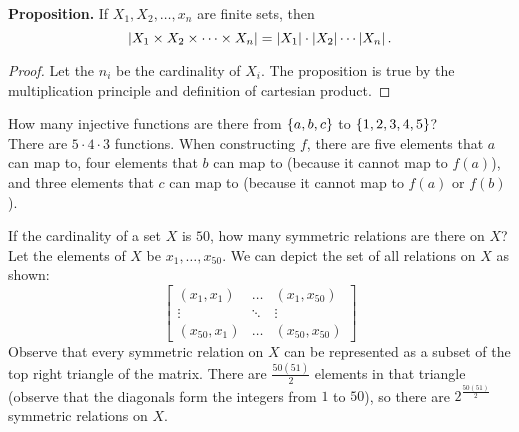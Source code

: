 \documentclass[class=article, crop=false]{standalone}
\begin{document}
  \textbf{Proposition.} If $X_1, X_2, \dotsc , x_n$ are finite sets, then
  \[
    \left\lvert X_1 \times X_2 \times \dotsb \times X_n \right\rvert = \left\lvert X_1 \right\rvert \cdot \left\lvert X_2 \right\rvert \dotsm \left\lvert X_n \right\rvert.
  \]
  \begin{proof}
    Let the $n_i$ be the cardinality of $X_i$. The proposition is true by the multiplication principle and definition of cartesian product.
  \end{proof}
  \begin{example}{}
    How many injective functions are there from $\left\{a, b, c\right\}$ to $\left\{1, 2, 3, 4, 5\right\}$? \\[10pt]
    There are $5 \cdot 4 \cdot 3$ functions. When constructing $f$, there are five elements that $a$ can map to, four elements that $b$ can map to (because it cannot map to $f(a)$), and three elements that $c$ can map to (because it cannot map to $f(a)$ or $f(b)$).
  \end{example}
  \begin{example}{}
    If the cardinality of a set $X$ is $50$, how many symmetric relations are there on $X$? \\[10pt]
    Let the elements of $X$ be $x_1, \dotsc, x_{50}$. We can depict the set of all relations on $X$ as shown:
    \[\begin{bmatrix}
    (x_1, x_1) & \dotsc & (x_1, x_{50}) \\
    \vdots & \ddots & \vdots \\
    (x_{50}, x_1) & \dotsc & (x_{50}, x_{50})
    \end{bmatrix}\]
    Observe that every symmetric relation on $X$ can be represented as a subset of the top right triangle of the matrix. There are $\frac{50(51)}{2}$ elements in that triangle (observe that the diagonals form the integers from $1$ to $50$), so there are $2^{\frac{50(51)}{2}}$ symmetric relations on $X$.
  \end{example}
\end{document}
